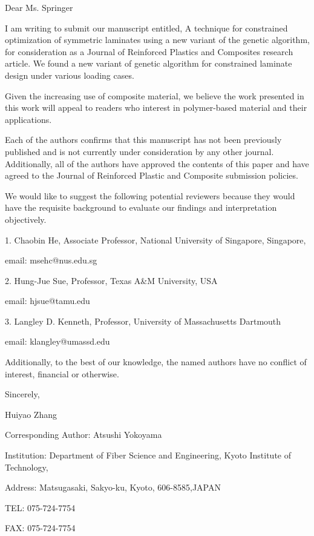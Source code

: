 \documentclass{article}
\begin{document}
Dear Ms. Springer 

\vskip 0.1in
I am writing to submit our manuscript entitled, A technique for constrained optimization of
symmetric laminates using a new variant of the genetic algorithm, for consideration as a Journal of
Reinforced Plastics and Composites research article. We found a new variant of genetic algorithm for constrained
laminate design under various loading cases.


\vskip 0.1in
Given the increasing use of composite material, we believe the work presented in this work will
appeal to readers who interest in polymer-based material and their applications. 

\vskip 0.1in

Each of the authors confirms that this manuscript has not been previously published and is not
currently under consideration by any other journal. Additionally, all of the authors have approved
the contents of this paper and have agreed to the Journal of Reinforced Plastic and Composite submission
policies.

\vskip 0.1in

We would like to suggest the following potential
reviewers because they would have the requisite background to evaluate our findings and
interpretation objectively.

\vskip 0.05in
1.  Chaobin He, Associate Professor, National University of Singapore, Singapore,

	email: msehc@nus.edu.sg 

\vskip 0.02in
2.  Hung-Jue Sue, Professor,  Texas A\&M University, USA 

	email: hjsue@tamu.edu 
\vskip 0.02in

3.  Langley D. Kenneth,  Professor, University of Massachusetts Dartmouth 

	email: klangley@umassd.edu
\vskip 0.05in


Additionally, to the best of our knowledge, the named authors have no conflict of
interest, financial or otherwise.

\vskip 0.15in

Sincerely,

Huiyao Zhang

\vskip 0.2in
Corresponding Author: Atsushi Yokoyama

Institution: Department of Fiber Science and Engineering, Kyoto Institute of Technology,

Address:   Matsugasaki, Sakyo-ku, Kyoto, 606-8585,JAPAN

TEL: 075-724-7754  

FAX:  075-724-7754
\end{document}

